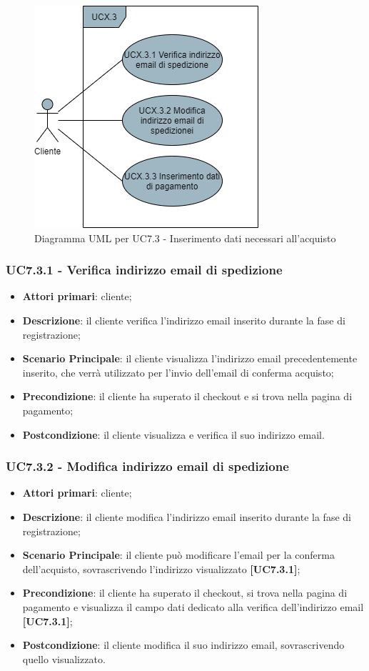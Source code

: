 \begin{figure}[H]
\centering
\includegraphics[scale=0.6]{res/UseCase/Immagini/InserimentoDatiAcquisto}
\caption{Diagramma UML per UC7.3 - Inserimento dati necessari all'acquisto}
\end{figure}

\subsubsection{UC7.3.1 - Verifica indirizzo email di spedizione}
\begin{itemize}
\item \textbf{Attori primari}: cliente;
\item \textbf{Descrizione}: il cliente verifica l'indirizzo email inserito durante la fase di registrazione;
\item \textbf{Scenario Principale}: il cliente visualizza l'indirizzo email precedentemente inserito, che verrà utilizzato per l'invio dell'email di conferma acquisto;
\item \textbf{Precondizione}: il cliente ha superato il checkout e si trova nella pagina di pagamento;
\item \textbf{Postcondizione}: il cliente visualizza e verifica il suo indirizzo email.
\end{itemize}

\subsubsection{UC7.3.2 - Modifica indirizzo email di spedizione}
\begin{itemize}
\item \textbf{Attori primari}: cliente;
\item \textbf{Descrizione}: il cliente modifica l'indirizzo email inserito durante la fase di registrazione;
\item \textbf{Scenario Principale}: il cliente può modificare l'email per la conferma dell'acquisto, sovrascrivendo l'indirizzo visualizzato \textbf{[UC7.3.1]};
\item \textbf{Precondizione}: il cliente ha superato il checkout, si trova nella pagina di pagamento e visualizza il campo dati dedicato alla verifica dell'indirizzo email \textbf{[UC7.3.1]};
\item \textbf{Postcondizione}: il cliente modifica il suo indirizzo email, sovrascrivendo quello visualizzato.
\end{itemize}

